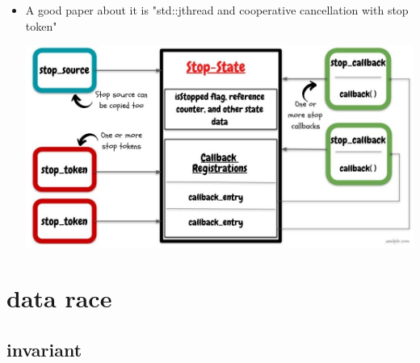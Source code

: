\documentclass[a4paper,11pt,twoside]{book}
\begin{document}
\begin{itemize}
\item A good paper about it is "std::jthread and cooperative cancellation with stop token"
		
\includegraphics[width=0.85\linewidth]{pics/stop_token.jpg}
	
\end{itemize}

\section{data race}
\subsection{invariant}
\end{document}
